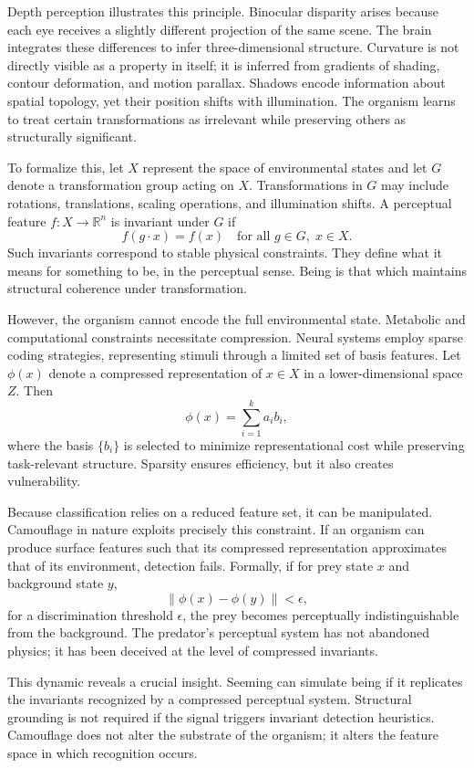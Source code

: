 \documentclass[11pt]{article}
\begin{document}
Depth perception illustrates this principle. Binocular disparity arises because each eye receives a slightly different projection of the same scene. The brain integrates these differences to infer three-dimensional structure. Curvature is not directly visible as a property in itself; it is inferred from gradients of shading, contour deformation, and motion parallax. Shadows encode information about spatial topology, yet their position shifts with illumination. The organism learns to treat certain transformations as irrelevant while preserving others as structurally significant.

To formalize this, let $X$ represent the space of environmental states and let $G$ denote a transformation group acting on $X$. Transformations in $G$ may include rotations, translations, scaling operations, and illumination shifts. A perceptual feature $f : X \to \mathbb{R}^n$ is invariant under $G$ if
\[
f(g \cdot x) = f(x) \quad \text{for all } g \in G, \; x \in X.
\]
Such invariants correspond to stable physical constraints. They define what it means for something to be, in the perceptual sense. Being is that which maintains structural coherence under transformation.

However, the organism cannot encode the full environmental state. Metabolic and computational constraints necessitate compression. Neural systems employ sparse coding strategies, representing stimuli through a limited set of basis features. Let $\phi(x)$ denote a compressed representation of $x \in X$ in a lower-dimensional space $Z$. Then
\[
\phi(x) = \sum_{i=1}^{k} a_i b_i,
\]
where the basis $\{b_i\}$ is selected to minimize representational cost while preserving task-relevant structure. Sparsity ensures efficiency, but it also creates vulnerability.

Because classification relies on a reduced feature set, it can be manipulated. Camouflage in nature exploits precisely this constraint. If an organism can produce surface features such that its compressed representation approximates that of its environment, detection fails. Formally, if for prey state $x$ and background state $y$,
\[
\|\phi(x) - \phi(y)\| < \epsilon,
\]
for a discrimination threshold $\epsilon$, the prey becomes perceptually indistinguishable from the background. The predator’s perceptual system has not abandoned physics; it has been deceived at the level of compressed invariants.

This dynamic reveals a crucial insight. Seeming can simulate being if it replicates the invariants recognized by a compressed perceptual system. Structural grounding is not required if the signal triggers invariant detection heuristics. Camouflage does not alter the substrate of the organism; it alters the feature space in which recognition occurs.
\end{document}

